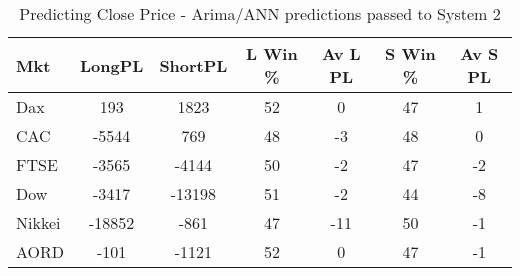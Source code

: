 \begin{table}[ht]
\centering
\caption[Predicting Close Price - Arima/ANN predictions passed to System 2.]{Predicting Close Price - Arima/ANN predictions passed to System 2} 
\label{tab:chp_ts:arima_ann_sys2}
\begin{tabular}{lcccccc}
  \toprule Mkt & LongPL & ShortPL & L Win \% & Av L PL & S Win \% & Av S PL \\ 
  \midrule Dax & 193 & 1823 & 52 & 0 & 47 & 1 \\ 
  CAC & -5544 & 769 & 48 & -3 & 48 & 0 \\ 
  FTSE & -3565 & -4144 & 50 & -2 & 47 & -2 \\ 
  Dow & -3417 & -13198 & 51 & -2 & 44 & -8 \\ 
  Nikkei & -18852 & -861 & 47 & -11 & 50 & -1 \\ 
  AORD & -101 & -1121 & 52 & 0 & 47 & -1 \\ 
   \bottomrule \end{tabular}
\end{table}
